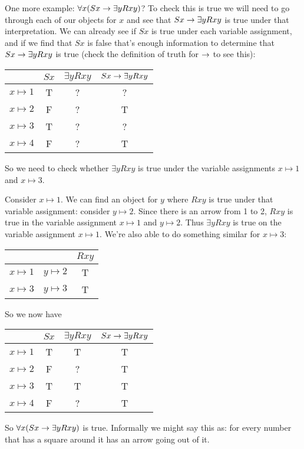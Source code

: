 One more example: $\forall x(Sx\rightarrow \exists y Rxy)$? To check this is true we will need to go through each of our objects for $x$ and see that $Sx\rightarrow \exists y Rxy$ is true under that interpretation. We can already see if $Sx$ is true under each variable assignment, and if we find that $Sx$ is false that's enough information to determine that $Sx\rightarrow \exists y Rxy$ is true (check the definition of truth for $\rightarrow$ to see this):
\begin{center}
\begin{tabular}{c|ccc}
&$Sx$&$\exists y Rxy$&$Sx\rightarrow\exists y Rxy$\Bstrut\\\hline\Tstrut
$x\mapsto 1$&T&?&?\\
$x\mapsto 2$&F&?&T\\
$x\mapsto 3$&T&?&?\\
$x\mapsto 4$&F&?&T
\end{tabular}
\end{center}

So we need to check  whether $\exists y Rxy$ is true under the variable assignments $x\mapsto 1$ and $x\mapsto 3$. 

Consider $x\mapsto 1$. We can find an object for $y$ where $Rxy$ is true under that variable assignment: consider $y\mapsto 2$. Since there is an arrow from 1 to 2, $Rxy$ is true in the variable assignment $x\mapsto 1$ and $y\mapsto 2$. Thus $\exists y Rxy$ is true on the variable assignment $x\mapsto 1$. We're also able to do something similar for $x\mapsto 3$: 
\begin{center}
\begin{tabular}{cc|c}
&&$Rxy$\Bstrut\\\hline\Tstrut
$x\mapsto 1$&$y\mapsto 2$&T\\
$x\mapsto 3$&$y\mapsto 3$&T
 \end{tabular}
\end{center}So we now have
\begin{center}
\begin{tabular}{c|ccc}
&$Sx$&$\exists y Rxy$&$Sx\rightarrow\exists y Rxy$\Bstrut\\\hline\Tstrut
$x\mapsto 1$&T&T&T\\
$x\mapsto 2$&F&?&T\\
$x\mapsto 3$&T&T&T\\
$x\mapsto 4$&F&?&T
\end{tabular}
\end{center}So $\forall x(Sx\rightarrow \exists y Rxy)$ is true. Informally we might say this as: for every number that has a square around it has an arrow going out of it. 


